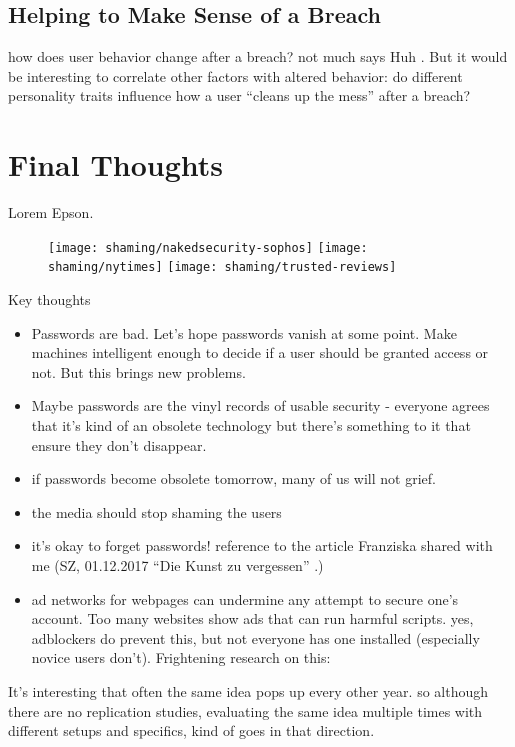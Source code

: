 \subsection{Helping to Make Sense of a Breach}
how does user behavior change after a breach? not much says Huh \etal \cite{Huh2017TooBusy}. But it would be interesting to correlate other factors with altered behavior: do different personality traits influence how a user ``cleans up the mess'' after a breach?


\section{Final Thoughts}
Lorem Epson. 

\begin{figure}[htpb]
	\centering
	\texttt{[image: shaming/nakedsecurity-sophos]}
	\texttt{[image: shaming/nytimes]}
	\texttt{[image: shaming/trusted-reviews]}
\end{figure}

Key thoughts

\begin{itemize}
\item Passwords are bad. Let's hope passwords vanish at some point. Make machines intelligent enough to decide if a user should be granted access or not. But this brings new problems.
\item Maybe passwords are the vinyl records of usable security - everyone agrees that it's kind of an obsolete technology but there's something to it that ensure they don't disappear. %
 \item  if passwords become obsolete tomorrow, many of us will not grief. 
 \item  the media should stop shaming the users 
 \item  it's okay to forget passwords! reference to the article Franziska shared with me (SZ,  01.12.2017 ``Die Kunst zu vergessen'' .)
 \item 	ad networks for webpages can undermine any attempt to secure one's account. Too many websites show ads that can run harmful scripts. yes, adblockers do prevent this, but not everyone has one installed (especially novice users don't). Frightening research on this: 
\end{itemize}

It's interesting that often the same idea pops up every other year. so although there are no replication studies, evaluating the same idea multiple times with different setups and specifics, kind of goes in that direction. 



